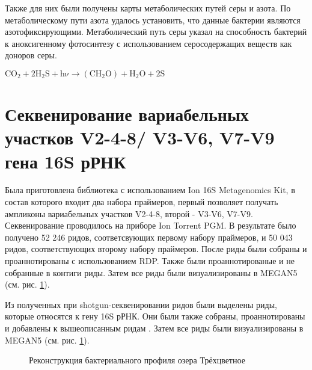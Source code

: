Также для них были получены карты метаболических путей серы и азота. По метаболическому пути азота удалось установить, что данные бактерии являются азотофиксирующими. Метаболический путь серы указал на способность бактерий к аноксигенному фотосинтезу с использованием серосодержащих веществ как доноров серы. 

\begin{center}
$\mathrm{C O_2 + 2H_2 S + h\nu \xrightarrow{} (C H_2 O) + H_2 O + 2 S}$
\end{center} 

\section{Секвенирование вариабельных участков V2-4-8/ V3-V6, V7-V9 гена 16S рРНК} \label{sect2_2}

Была приготовлена библиотека с использованием  Ion 16S Metagenomics Kit, в состав которого входит два набора праймеров, первый позволяет получать ампликоны вариабельных участков V2-4-8, второй - V3-V6, V7-V9. Секвенирование проводилось на приборе Ion Torrent PGM. В результате было получено 52 246 ридов, соответсвующих первому набору праймеров, и 50 043 ридов, соответствующих второму набору праймеров. После риды были собраны и проаннотированы с использованием RDP. Также были проаннотированые и не собранные в контиги риды. Затем все риды были визуализированы в MEGAN5 (см. рис. \ref{ris:sg+16S}). 

Из полученных при shotgun-секвенировании ридов были выделены риды, которые относятся к гену 16S рРНК. Они были также собраны, проаннотированы и добавлены к вышеописанным ридам . Затем все риды были визуализированы в MEGAN5 (см. рис. \ref{ris:sg+16S}). 

\begin{figure}[h]
\begin{minipage}[h]{0.6\linewidth}
\center{\texttt{[image: sg+16S]} \\ }
\end{minipage}
\hfill
\begin{minipage}[h]{0.5\linewidth}
\end{minipage}
\caption{Реконструкция бактериального профиля озера Трёхцветное}
\label{ris:sg+16S}
\end{figure}

